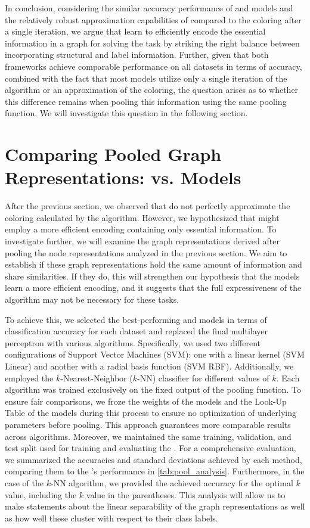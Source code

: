 In conclusion, considering the similar accuracy performance of \gnn and \wlnn models and the relatively robust approximation capabilities of \gnns compared to the \wl coloring after a single iteration, we argue that \gnns learn to efficiently encode the essential information in a graph for solving the task by striking the right balance between incorporating structural and label information. Further, given that both frameworks achieve comparable performance on all datasets in terms of accuracy, combined with the fact that most models utilize only a single iteration of the \wl algorithm or an approximation of the coloring, the question arises as to whether this difference remains when pooling this information using the same pooling function. We will investigate this question in the following section.

\FloatBarrier
\section{Comparing Pooled Graph Representations: \gnn vs. \wlnn Models}
After the previous section, we observed that \gnns do not perfectly approximate the coloring calculated by the \wl algorithm. However, we hypothesized that \gnns might employ a more efficient encoding containing only essential information. To investigate further, we will examine the graph representations derived after pooling the node representations analyzed in the previous section. We aim to establish if these graph representations hold the same amount of information and share similarities. If they do, this will strengthen our hypothesis that the \gnn models learn a more efficient encoding, and it suggests that the full expressiveness of the \wl algorithm may not be necessary for these tasks.

To achieve this, we selected the best-performing \gnn and \wlnn models in terms of classification accuracy for each dataset and replaced the final multilayer perceptron with various algorithms. Specifically, we used two different configurations of \textsf{Support Vector Machines (SVM)}: one with a linear kernel (\textsf{SVM Linear}) and another with a radial basis function (\textsf{SVM RBF}). Additionally, we employed the \textsf{$k$-Nearest-Neighbor ($k$-NN)} classifier for different values of $k$. Each algorithm was trained exclusively on the fixed output of the pooling function. To ensure fair comparisons, we froze the weights of the \gnn models and the Look-Up Table of the \wlnn models during this process to ensure no optimization of underlying parameters before pooling. This approach guarantees more comparable results across algorithms. Moreover, we maintained the same training, validation, and test split used for training and evaluating the \mlp. For a comprehensive evaluation, we summarized the accuracies and standard deviations achieved by each method, comparing them to the \mlp's performance in \cref{tab:pool_analysis}. Furthermore, in the case of the \textsf{$k$-NN} algorithm, we provided the achieved accuracy for the optimal $k$ value, including the $k$ value in the parentheses. This analysis will allow us to make statements about the linear separability of the graph representations as well as how well these cluster with respect to their class labels.

